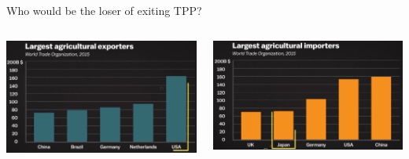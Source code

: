 \documentclass[10pt,hyperref={CJKbookmarks=true},xcolor=dvipsnames,aspectratio=43]{beamer}
\begin{document}
\begin{frame}{Who would be the loser of exiting TPP?}


\begin{columns}[onlytextwidth]
\begin{column}{0.45\textwidth}
\includegraphics[width=\columnwidth]{fig//trump6}
\end{column}
\begin{column}{0.45\textwidth}
\includegraphics[width=\columnwidth]{fig//trump7}
\end{column}
\end{columns}
\end{frame}
\end{document}
